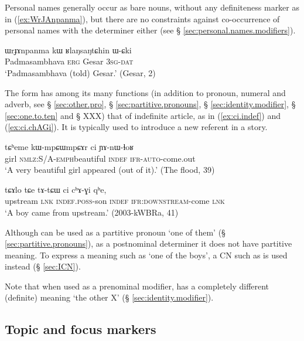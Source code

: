 Personal names generally occur as bare nouns, without any definiteness marker as in (\ref{ex:WrJAnpanma}), but there are no constraints against co-occurrence of personal names with the determiner  either (see § \ref{sec:personal.names.modifiers}).

\begin{exe}
\ex \label{ex:WrJAnpanma}
\gll  ɯrɟɤnpanma kɯ ʁlaŋsaŋtɕhin ɯ-ɕki  \\
 Padmasambhava \textsc{erg} Gesar \textsc{3sg}-\textsc{dat} \\
\glt `Padmasambhava (told) Gesar.' (Gesar, 2)
\end{exe}

The form  has among its many functions (in addition to pronoun, numeral and adverb, see § \ref{sec:other.pro}, § \ref{sec:partitive.pronouns}, § \ref{sec:identity.modifier}, § \ref{sec:one.to.ten} and § XXX) that of indefinite article, as in (\ref{ex:ci.indef}) and (\ref{ex:ci.chAGi}). It is typically used to introduce a new referent in a story.

\begin{exe}
\ex \label{ex:ci.indef}
\gll tɕʰeme kɯ-mpɕɯ\redp{}mpɕɤr 	ci 	ɲɤ-nɯ-ɬoʁ \\
girl \textsc{nmlz}:S/A-\textsc{emph}\redp{}beautiful \textsc{indef} \textsc{ifr}-\textsc{auto}-come.out \\
\glt `A very beautiful girl appeared (out of it).' (The flood, 39)
\end{exe}

\begin{exe}
\ex \label{ex:ci.chAGi}
\gll tɕɤlo tɕe tɤ-tɕɯ ci cʰɤ-ɣi qʰe, \\
upstream \textsc{lnk} \textsc{indef}.\textsc{poss}-son \textsc{indef} \textsc{ifr}:\textsc{downstream}-come \textsc{lnk} \\
\glt `A boy came from upstream.' (2003-kWBRa, 41)
\end{exe}

Although  can be used as a partitive pronoun `one of them' (§ \ref{sec:partitive.pronouns}), as a postnominal determiner it does not have partitive meaning. To express a meaning such as `one of the boys', a CN such as  is used instead (§ \ref{sec:ICN}). 

Note that when used as a prenominal modifier,  has a completely different (definite) meaning `the other X' (§ \ref{sec:identity.modifier}).

 \subsection{Topic and focus markers} \label{sec:topic}
 
